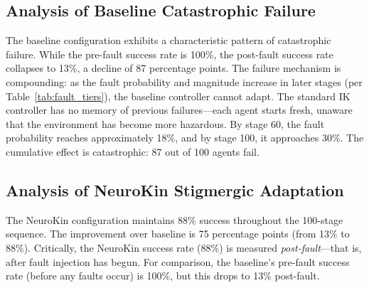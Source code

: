 \documentclass[12pt,a4paper,oneside]{report}
\begin{document}
\begin{table}[H]
\centering
\caption{Sequential swarm performance comparison (100 stages, progressive fault injection).}
\label{tab:swarm_results}
\end{table}

\subsection{Analysis of Baseline Catastrophic Failure}

The baseline configuration exhibits a characteristic pattern of catastrophic failure. While the pre-fault success rate is 100\%, the post-fault success rate collapses to 13\%, a decline of 87 percentage points. The failure mechanism is compounding: as the fault probability and magnitude increase in later stages (per Table~\ref{tab:fault_tiers}), the baseline controller cannot adapt. The standard IK controller has no memory of previous failures---each agent starts fresh, unaware that the environment has become more hazardous. By stage 60, the fault probability reaches approximately 18\%, and by stage 100, it approaches 30\%. The cumulative effect is catastrophic: 87 out of 100 agents fail.

\subsection{Analysis of NeuroKin Stigmergic Adaptation}

The NeuroKin configuration maintains 88\% success throughout the 100-stage sequence. The improvement over baseline is 75 percentage points (from 13\% to 88\%). Critically, the NeuroKin success rate (88\%) is measured \textit{post-fault}---that is, after fault injection has begun. For comparison, the baseline's pre-fault success rate (before any faults occur) is 100\%, but this drops to 13\% post-fault.
\end{document}
